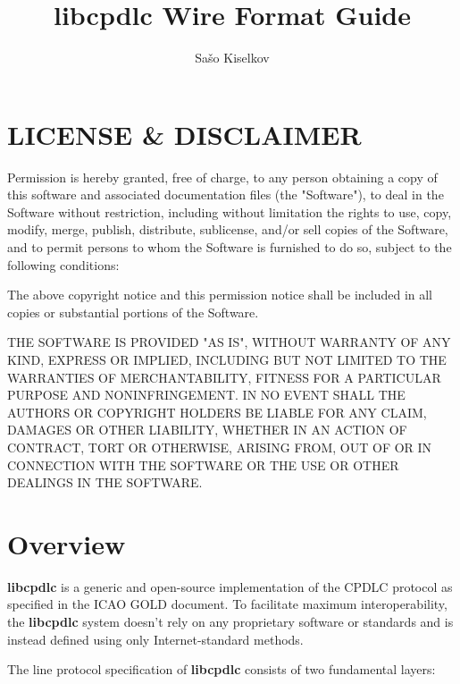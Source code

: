 \documentclass[a4paper,12pt]{article}
\title{libcpdlc Wire Format Guide}
\author{Sa\v so Kiselkov}
\newcommand{\libcpdlc}{\textbf{libcpdlc}\xspace}
\begin{document}

\tableofcontents

\newpage

\thispagestyle{empty}

\section{LICENSE \& DISCLAIMER}

Permission is hereby granted, free of charge, to any person obtaining a
copy of this software and associated documentation files (the
"Software"), to deal in the Software without restriction, including
without limitation the rights to use, copy, modify, merge, publish,
distribute, sublicense, and/or sell copies of the Software, and to permit
persons to whom the Software is furnished to do so, subject to the
following conditions:

\strut

\noindent The above copyright notice and this permission notice shall be
included in all copies or substantial portions of the Software.

\strut

\noindent THE SOFTWARE IS PROVIDED "AS IS", WITHOUT WARRANTY OF ANY KIND,
EXPRESS OR IMPLIED, INCLUDING BUT NOT LIMITED TO THE WARRANTIES OF
MERCHANTABILITY, FITNESS FOR A PARTICULAR PURPOSE AND NONINFRINGEMENT. IN
NO EVENT SHALL THE AUTHORS OR COPYRIGHT HOLDERS BE LIABLE FOR ANY CLAIM,
DAMAGES OR OTHER LIABILITY, WHETHER IN AN ACTION OF CONTRACT, TORT OR
OTHERWISE, ARISING FROM, OUT OF OR IN CONNECTION WITH THE SOFTWARE OR THE
USE OR OTHER DEALINGS IN THE SOFTWARE.

\newpage

\section{Overview}

\noindent\libcpdlc is a generic and open-source implementation of the
CPDLC protocol as specified in the ICAO GOLD document. To facilitate
maximum interoperability, the \libcpdlc system doesn't rely on any
proprietary software or standards and is instead defined using only
Internet-standard methods.

\noindent The line protocol specification of \libcpdlc consists of two
fundamental layers:
\end{document}
